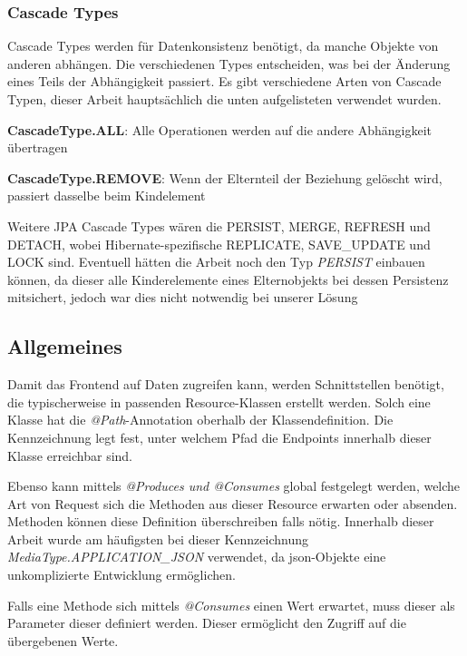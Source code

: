 \subsubsection{Cascade Types}
\label{chap:cascade}

Cascade Types werden für Datenkonsistenz benötigt, da manche Objekte von anderen abhängen. 
Die verschiedenen Types entscheiden, was bei der Änderung eines Teils der Abhängigkeit passiert. 
Es gibt verschiedene Arten von Cascade Typen, dieser Arbeit hauptsächlich die unten aufgelisteten verwendet wurden.
\cite{CascadeTypes}

\begin{compactitem}
    \item \textbf{CascadeType.ALL}: Alle Operationen werden auf die andere Abhängigkeit übertragen \cite{CascadeTypes}
    \item \textbf{CascadeType.REMOVE}: Wenn der Elternteil der Beziehung gelöscht wird, passiert dasselbe beim Kindelement \cite{CascadeTypes}
\end{compactitem}

Weitere JPA Cascade Types wären die PERSIST, MERGE, REFRESH und DETACH, wobei Hibernate-spezifische REPLICATE, SAVE\_UPDATE und LOCK sind.
Eventuell hätten die Arbeit noch den Typ \emph{PERSIST} einbauen können, da dieser alle Kinderelemente eines Elternobjekts bei dessen Persistenz mitsichert, jedoch war dies nicht notwendig bei unserer Lösung
\cite{CascadeTypes}


\subsection{Allgemeines}

Damit das Frontend auf Daten zugreifen kann, werden Schnittstellen benötigt, die typischerweise in passenden Resource-Klassen erstellt werden. 
Solch eine Klasse hat die \emph{@Path}-Annotation oberhalb der Klassendefinition. 
Die Kennzeichnung legt fest, unter welchem Pfad die Endpoints innerhalb dieser Klasse erreichbar sind.

Ebenso kann mittels \emph{@Produces und @Consumes} global festgelegt werden, welche Art von Request sich die Methoden aus dieser Resource erwarten oder absenden. 
Methoden können diese Definition überschreiben falls nötig. 
Innerhalb dieser Arbeit wurde am häufigsten bei dieser Kennzeichnung \emph{MediaType.APPLICATION\_JSON} verwendet, da \gls{json}-Objekte eine unkomplizierte Entwicklung ermöglichen.

Falls eine Methode sich mittels \emph{@Consumes} einen Wert erwartet, muss dieser als Parameter dieser definiert werden. 
Dieser ermöglicht den Zugriff auf die übergebenen Werte.

